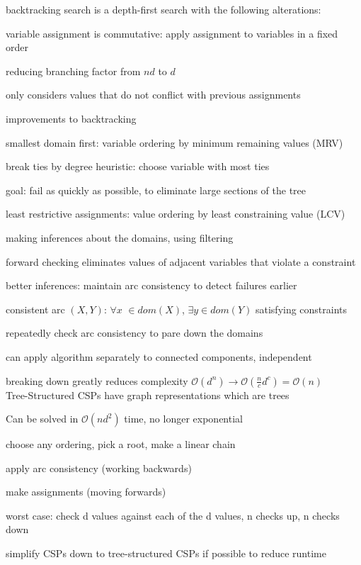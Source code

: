 \documentclass[12pt]{article}
\begin{document}
\noindent
backtracking search is a depth-first search with the following alterations:

variable assignment is commutative: apply assignment to variables in a fixed order

reducing branching factor from $nd$ to $d$

only considers values that do not conflict with previous assignments

\noindent
improvements to backtracking

smallest domain first: variable ordering by minimum remaining values (MRV)

break ties by degree heuristic: choose variable with most ties

goal: fail as quickly as possible, to eliminate large sections of the tree

least restrictive assignments: value ordering by least constraining value (LCV)

\noindent
making inferences about the domains, using filtering

forward checking eliminates values of adjacent variables that violate a constraint

\noindent
better inferences: maintain arc consistency to detect failures earlier

consistent arc $(X, Y)$: $\forall x$ $\in dom(X)$, $\exists y \in dom(Y)$ satisfying constraints

repeatedly check arc consistency to pare down the domains

\noindent
can apply algorithm separately to connected components, independent

breaking down greatly reduces complexity $\mathcal{O}(d^n) \to \mathcal{O}(\frac{n}{c}d^c) = \mathcal{O}(n)$\\

\noindent
Tree-Structured CSPs have graph representations which are trees

Can be solved in $\mathcal{O}(nd^2)$ time, no longer exponential

choose any ordering, pick a root, make a linear chain

apply arc consistency (working backwards)

make assignments (moving forwards)

worst case: check d values against each of the d values, n checks up, n checks down

\noindent
simplify CSPs down to tree-structured CSPs if possible to reduce runtime
\end{document}
